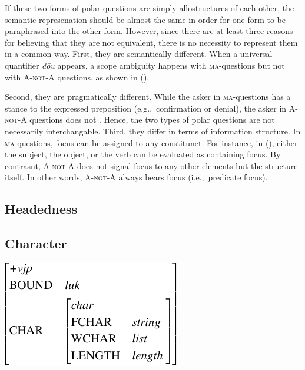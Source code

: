 \documentclass[11pt]{article}
\def\anota{\textsc{A-not-A}}
\newcommand{\myref}[1]{(\getref{#1})}
\begin{document}
\noindent If these two forms of polar questions are simply
allostructures of each other, the semantic represenation should be
almost the same in order for one form to be paraphrased into the other
form. However, since there are at least three reasons for believing
that they are not equivalent, there is no necessity to represent them
in a common way.  First, they are semantically different.  When a
universal quantifier \textit{d\={o}u} appears, a scope ambiguity
happens with \textsc{ma}-questions but not with {\anota} questions, as
shown in \myref{exe:scope}.


{\small 
{}}
\vspace{-20pt}

\noindent Second, they are pragmatically different. While the asker in
\textsc{ma}-questions has a stance to the expressed preposition
(e.g.,\ confirmation or denial), the asker in {\anota} questions does
not \cite{liing:14}. Hence, the two types of polar questions are not
necessarily interchangable. Third, they differ in terms of information
structure. In \textsc{ma}-questions, focus can be assigned to any
constitunet. For instance, in \myref{exe:yesno}, either the subject,
the object, or the verb can be evaluated as containing focus. By
contrasnt, {\anota} does not signal focus to any other elements but
the structure itself. In other words, {\anota} always bears focus
(i.e.,\ predicate focus).


\subsection{Headedness}
\label{ssec:head}



\subsection{Character}
\label{ssec:char}



{\small 
\ex{}
\vspace{-10pt}
\newline
\includegraphics[scale=.8]{pdf/vjp.pdf}
\xe}
\vspace{-20pt}
\end{document}
